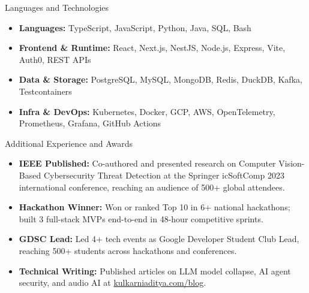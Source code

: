 \documentclass[]{mcdowellcv}
\begin{document}
\begin{cvsection}{Languages and Technologies}
  \begin{cvsubsection}{}{}{}
    \begin{itemize}
      \item \textbf{Languages:} TypeScript, JavaScript, Python, Java, SQL, Bash
      \item \textbf{Frontend \& Runtime:} React, Next.js, NestJS, Node.js, Express, Vite, Auth0, REST APIs
      \item \textbf{Data \& Storage:} PostgreSQL, MySQL, MongoDB, Redis, DuckDB, Kafka, Testcontainers
      \item \textbf{Infra \& DevOps:} Kubernetes, Docker, GCP, AWS, OpenTelemetry, Prometheus, Grafana, GitHub Actions
    \end{itemize}
  \end{cvsubsection}
\end{cvsection}

\begin{cvsection}{Additional Experience and Awards}
  \begin{cvsubsection}{}{}{}
    \begin{itemize}
      \item \textbf{IEEE Published:} Co-authored and presented research on Computer Vision-Based Cybersecurity Threat Detection at the Springer icSoftComp 2023 international conference, reaching an audience of 500+ global attendees.
      \item \textbf{Hackathon Winner:} Won or ranked Top 10 in 6+ national hackathons; built 3 full-stack MVPs end-to-end in 48-hour competitive sprints.
      \item \textbf{GDSC Lead:} Led 4+ tech events as Google Developer Student Club Lead, reaching 500+ students across hackathons and conferences.
      \item \textbf{Technical Writing:} Published articles on LLM model collapse, AI agent security, and audio AI at \href{https://www.kulkarniaditya.com/blog}{kulkarniaditya.com/blog}.
    \end{itemize}
  \end{cvsubsection}
\end{cvsection}
\end{document}
